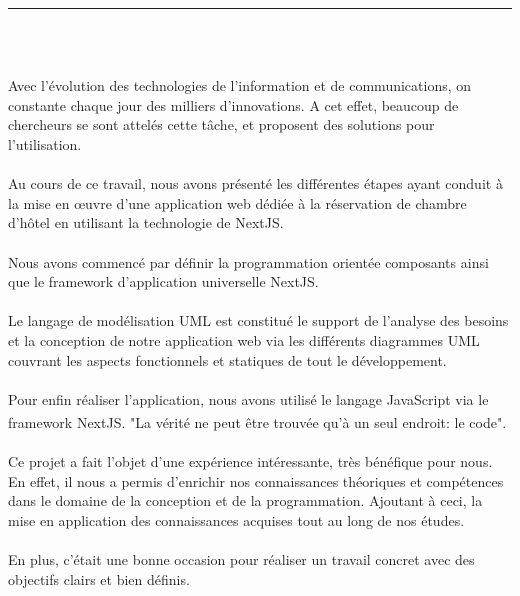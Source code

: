 \documentclass[12pt]{report}
\begin{document}
\newpage

\newpage

\vspace*{-0.2in}

\begin{center}
    {\color{Blue} \rule{5.5in}{1.4mm} }\\
    \vspace{0.1in}
    \scshape{\fontsize{34}{46}{\bfseries{\color{Blue}{Conclusion générale}}}}
    \\
    \vspace{0.5in}
\end{center}
\hspace*{0.16in}
Avec l’évolution des technologies de l’information et de communications, on constante chaque jour des milliers d’innovations. A cet effet, beaucoup de chercheurs se sont attelés cette tâche, et proposent des solutions pour l’utilisation.
\\\\
\hspace*{0.16in}
Au cours de ce travail, nous avons présenté les différentes étapes ayant conduit à la mise en œuvre d’une application web dédiée à la réservation de chambre d’hôtel en utilisant la technologie de NextJS.
\\\\
\hspace*{0.16in}
Nous avons commencé par définir la programmation orientée composants ainsi que le framework d’application universelle NextJS.
\\\\
\hspace*{0.16in}
Le langage de modélisation UML est constitué le support de l’analyse des besoins et la conception de notre application web via les différents diagrammes UML couvrant les aspects fonctionnels et statiques de tout le développement.
\\\\
\hspace*{0.16in}
Pour enfin réaliser l’application, nous avons utilisé le langage JavaScript via le framework NextJS. "La vérité ne peut être trouvée qu’à un seul endroit: le code". \textsuperscript{\cite{martin2018clean}}
\\\\
\hspace*{0.16in}
Ce projet a fait l’objet d’une expérience intéressante, très bénéfique pour nous. En effet, il nous a permis d’enrichir nos connaissances théoriques et compétences dans le domaine de la conception et de la programmation. Ajoutant à ceci, la mise en application des connaissances acquises tout au long de nos études.
\\\\
\hspace*{0.16in}
En plus, c’était une bonne occasion pour réaliser un travail concret avec des objectifs clairs et bien définis. 

\newpage


\end{document}
